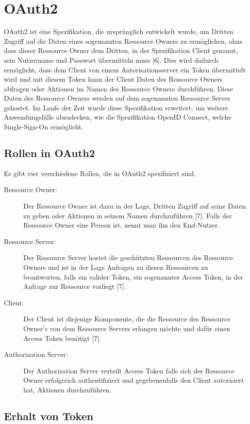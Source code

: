 %
%
\section{OAuth2}
\label{sec:OAuth2}
OAuth2 ist eine Spezifikation, die ursprünglich entwickelt wurde, um Dritten Zugriff auf die Daten eines sogenannten Ressource Owners zu ermöglichen, ohne dass dieser Ressource Owner dem Dritten, in der Spezifikation Client genannt, sein Nutzername und Passwort übermitteln muss [6].  Dies wird dadurch ermöglicht, dass dem Client von einem Autorisationsserver ein Token übermittelt wird und mit diesem Token kann der Client Daten des Ressource Owners abfragen oder Aktionen im Namen des Ressource Owners durchführen. Diese Daten des Ressource Owners werden auf dem sogenannten Ressource Server gehostet.
Im Laufe der Zeit wurde diese Spezifikation erweitert, um weitere Anwendungsfälle abzudecken, wie die Spezifikation OpenID Connect, welche Single-Sign-On ermöglicht. 

\subsection{Rollen in OAuth2}
\label{subsec:OAuth2:RolleninOAuth2}
Es gibt vier verschiedene Rollen, die in OAuth2 spezifiziert sind.

\begin{description}
  \item[Ressource Owner:] Der Ressource Owner ist dazu in der Lage, Dritten Zugriff auf seine Daten zu geben oder Aktionen in seinem Namen durchzuführen [7]. Falls der Ressource Owner eine Person ist, nennt man ihn den End-Nutzer.
  \item[Ressource Server:] Der Ressource Server hostet die geschützten Ressourcen des Ressource Owners und ist in der Lage Anfragen zu diesen Ressourcen zu beantworten, falls ein valider Token, ein sogenannter Access Token, in der Anfrage zur Ressource vorliegt [7].
  \item[Client:] Der Client ist diejenige Komponente, die die Ressource des Ressource Owner's von dem Ressource Servers erlangen möchte und dafür einen Access Token benötigt [7]. 
  \item[Authorization Server:] Der Authorization Server verteilt Access Token falls sich der Ressource Owner erfolgreich authentifiziert und gegebenenfalls den Client autorisiert hat, Aktionen durchzuführen. 
\end{description}

\subsection{Erhalt von Token}
\label{subsec:OAuth2:ErhaltvonToken}

